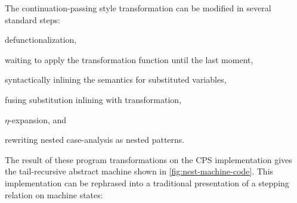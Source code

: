 \documentclass[sigplan,screen]{acmart}
\begin{document}
The continuation-passing style transformation can be modified in several
standard steps:
\begin{enumerate*}[(1)]
\item defunctionalization, 
\item waiting to apply the transformation function until the last moment,
\item syntactically inlining the semantics for substituted variables,
\item fusing substitution inlining with transformation,
\item $\eta$-expansion, and
\item rewriting nested case-analysis as nested patterns.
\end{enumerate*}
The result of these program transformations on the CPS implementation gives the
tail-recursive abstract machine shown in \cref{fig:nest-machine-code}.  This
implementation can be rephrased into a traditional presentation of a stepping
relation on machine states:
\end{document}
